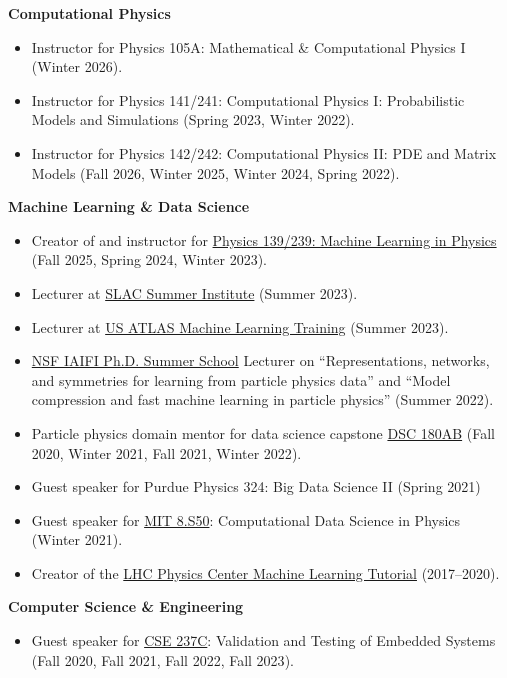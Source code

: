 \documentclass[11pt]{res}
\begin{document}
\begin{resume}
  \textbf{Computational Physics}
  \begin{itemize}
    \itemsep-0.3em
    \item Instructor for Physics 105A: Mathematical \& Computational Physics I (Winter 2026).
    \item Instructor for Physics 141/241: Computational Physics I: Probabilistic Models and Simulations ({Spring 2023, Winter 2022}).
    \item Instructor for Physics 142/242: Computational Physics II: PDE and Matrix Models ({Fall 2026, Winter 2025, Winter 2024, Spring 2022}).
  \end{itemize}

  \textbf{Machine Learning \& Data Science}
  \begin{itemize}
    \itemsep-0.3em
    \item Creator of and instructor for \href{https://jduarte.physics.ucsd.edu/phys139_239}{Physics 139/239: Machine Learning in Physics} ({Fall 2025, Spring 2024, Winter 2023}).
    \item Lecturer at \href{https://indico.slac.stanford.edu/event/7540/}{SLAC Summer Institute} (Summer 2023).
    \item Lecturer at \href{https://indico.cern.ch/event/1264566/}{US ATLAS Machine Learning Training} (Summer 2023).
    \item \href{https://iaifi.org/phd-summer-school.html}{NSF IAIFI Ph.D. Summer School} Lecturer on ``Representations, networks, and symmetries for learning from particle physics data'' and ``Model compression and fast machine learning in particle physics'' (Summer 2022).
    \item Particle physics domain mentor for data science capstone \href{https://jmduarte.github.io/capstone-particle-physics-domain}{DSC 180AB} ({Fall 2020, Winter 2021, Fall 2021, Winter 2022}).
    \item Guest speaker for Purdue Physics 324: Big Data Science II ({Spring 2021})
    \item Guest speaker for \href{https://github.com/violatingcp/MIT_8.S50}{MIT 8.S50}: Computational Data Science in Physics ({Winter 2021}).
    \item Creator of the \href{https://github.com/FNALLPC/machine-learning-hats}{LHC Physics Center Machine Learning Tutorial} ({2017--2020}).
  \end{itemize}

  \textbf{Computer Science \& Engineering}
  \begin{itemize}
    \itemsep-0.3em
    \item Guest speaker for \href{http://kastner.ucsd.edu/ryan/cse237c/}{CSE 237C}: Validation and Testing of Embedded Systems ({Fall 2020, Fall 2021, Fall 2022, Fall 2023}).
  \end{itemize}


\end{resume}
\end{document}

